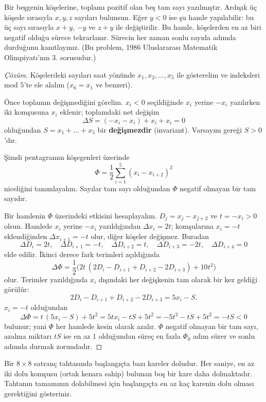 \begin{example}
Bir beşgenin köşelerine, toplamı pozitif olan beş tam sayı yazılmıştır. Ardışık üç köşede sırasıyla $x, y, z$ sayıları bulunsun. Eğer $y < 0$ ise şu hamle yapılabilir: bu üç sayı sırasıyla $x + y$, $-y$ ve $z + y$ ile değiştirilir. Bu hamle, köşelerden en az biri negatif olduğu sürece tekrarlanır. Sürecin her zaman sonlu sayıda adımda durduğunu kanıtlayınız. (Bu problem, 1986 Uluslararası Matematik Olimpiyatı'nın 3. sorusudur.)
\end{example}

\begin{proof}[Çözüm]
Köşelerdeki sayıları saat yönünde $x_1, x_2, \dots, x_5$ ile gösterelim ve indeksleri mod $5$'te ele alalım ($x_6 = x_1$ ve benzeri).

Önce toplamın değişmediğini görelim. $x_i < 0$ seçildiğinde $x_i$ yerine $-x_i$ yazılırken iki komşusuna $x_i$ eklenir; toplamdaki net değişim
\[
\Delta S = (-x_i - x_i) + x_i + x_i = 0
\]
olduğundan $S = x_1 + \dots + x_5$ bir \textbf{değişmezdir} (invariant). Varsayım gereği $S > 0$'dır.

Şimdi pentagramın köşegenleri üzerinde
\[
\Phi = \frac{1}{2}\sum_{i=1}^{5} (x_i - x_{i+2})^2
\]
niceliğini tanımlayalım. Sayılar tam sayı olduğundan $\Phi$ negatif olmayan bir tam sayıdır.

Bir hamlenin $\Phi$ üzerindeki etkisini hesaplayalım. $D_j = x_j - x_{j+2}$ ve $t = -x_i > 0$ olsun. Hamlede $x_i$ yerine $-x_i$ yazıldığından $\Delta x_i = 2t$; komşularına $x_i = -t$ eklendiğinden $\Delta x_{i\pm 1} = -t$ olur, diğer köşeler değişmez. Buradan
\[
\Delta D_i = 2t, \quad \Delta D_{i+1} = -t, \quad \Delta D_{i+2} = t, \quad \Delta D_{i+3} = -2t, \quad \Delta D_{i+4} = 0
\]
elde edilir. İkinci derece fark terimleri açıldığında
\[
\Delta\Phi = \frac{1}{2}\Big( 2t\,(2D_i - D_{i+1} + D_{i+2} - 2D_{i+3}) + 10t^2 \Big)
\]
olur. Terimler yazıldığında $x_i$ dışındaki her değişkenin tam olarak bir kez geldiği görülür:
\[
2D_i - D_{i+1} + D_{i+2} - 2D_{i+3} = 5x_i - S .
\]
$x_i = -t$ olduğundan
\[
\Delta\Phi = t\,(5x_i - S) + 5t^2 = 5t x_i - tS + 5t^2 = -5t^2 - tS + 5t^2 = -tS < 0
\]
bulunur; yani $\Phi$ her hamlede kesin olarak azalır. $\Phi$ negatif olmayan bir tam sayı, azalma miktarı $tS$ ise en az $1$ olduğundan süreç en fazla $\Phi_0$ adım sürer ve sonlu adımda durmak zorundadır.
\end{proof}

\begin{example}
Bir $8 \times 8$ satranç tahtasında başlangıçta bazı kareler doludur. Her saniye, en az iki dolu komşusu (ortak kenara sahip) bulunan boş bir kare daha dolmaktadır. Tahtanın tamamının dolabilmesi için başlangıçta en az kaç karenin dolu olması gerektiğini gösteriniz.
\end{example}

